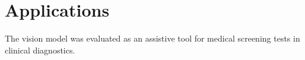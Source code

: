 \section{Applications}
The vision model was evaluated as an assistive tool for medical screening tests in clinical diagnostics.
